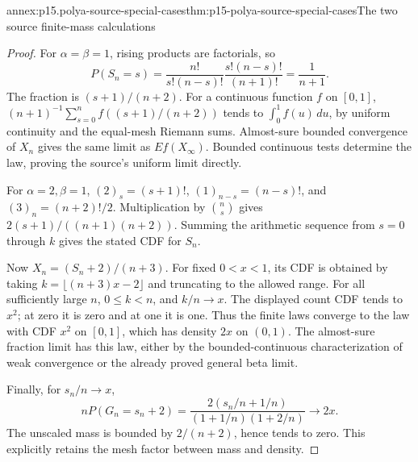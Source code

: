 \begin{annexitem}{annex:p15.polya-source-special-cases}{thm:p15-polya-source-special-cases}{The two source finite-mass calculations}
\begin{proof}
For \(\alpha=\beta=1\), rising products are factorials, so
\[
 P(S_n=s)=\frac{n!}{s!(n-s)!}\frac{s!(n-s)!}{(n+1)!}
                           =\frac1{n+1}.
\]
The fraction is \((s+1)/(n+2)\).
For a continuous function \(f\) on \([0,1]\),
\((n+1)^{-1}\sum_{s=0}^n f((s+1)/(n+2))\) tends to
\(\int_0^1f(u)\,du\), by uniform continuity and the equal-mesh
Riemann sums. Almost-sure bounded convergence of \(X_n\) gives the
same limit as \(Ef(X_\infty)\). Bounded continuous tests determine
the law, proving the source's uniform limit directly.

For \(\alpha=2,\beta=1\),
\((2)_s=(s+1)!\), \((1)_{n-s}=(n-s)!\), and
\((3)_n=(n+2)!/2\). Multiplication by \(\binom ns\) gives
\(2(s+1)/((n+1)(n+2))\).
Summing the arithmetic sequence from \(s=0\) through \(k\) gives
the stated CDF for \(S_n\).

Now \(X_n=(S_n+2)/(n+3)\).
For fixed \(0<x<1\), its CDF is obtained by taking
\(k=\lfloor(n+3)x-2\rfloor\) and truncating to the allowed range.
For all sufficiently large \(n\), \(0\leq k<n\), and \(k/n\to x\).
The displayed count CDF tends to \(x^2\); at zero it is zero and
at one it is one. Thus the finite laws converge to the law with
CDF \(x^2\) on \([0,1]\), which has density \(2x\) on \((0,1)\).
The almost-sure fraction limit has this law, either by the
bounded-continuous characterization of weak convergence or the
already proved general beta limit.

Finally, for \(s_n/n\to x\),
\[
 nP(G_n=s_n+2)
       =\frac{2(s_n/n+1/n)}
               {(1+1/n)(1+2/n)}\longrightarrow2x.
\]
The unscaled mass is bounded by \(2/(n+2)\), hence tends to zero.
This explicitly retains the mesh factor between mass and density.
\end{proof}
\end{annexitem}

